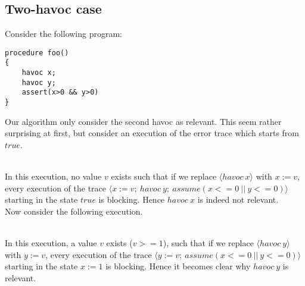 \documentclass{article}
\newcommand{\trace}[1]{\ensuremath{\langle #1 \rangle}\xspace} %
\begin{document}
\subsection{Two-havoc case}
Consider the following program:
\begin{lstlisting}
procedure foo()
{
	havoc x;
	havoc y;
	assert(x>0 && y>0)
}
\end{lstlisting}
Our algorithm only consider the second havoc as relevant. This seem rather surprising at first, but consider an execution of the error trace which starts from $true$.\\
\\
In this execution, no value $v$ exists such that if we replace $\trace{havoc\ x}$ with $x:=v$, every execution of the trace $\trace{x:=v;\ havoc\ y;\ assume(x<=0\ ||\ y<=0)}$ starting in the state $true$ is blocking. Hence $havoc\ x$ is indeed not relevant.\\
Now consider the following execution.\\
\\
In this execution, a value $v$ exists ($v>=1$), such that if we replace $\trace{havoc\ y}$ with $y:=v$, every execution of the trace $\trace{y:=v;\ assume(x<=0\ ||\ y<=0)}$ starting in the state $x:=1$ is blocking. Hence it becomes clear why $havoc\ y$ is relevant.
\end{document}
